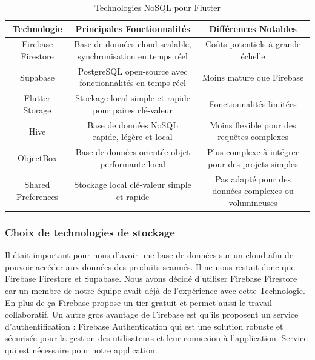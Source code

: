 \begin{table}[h!]
    \centering
    \begin{tabular}{|c|c|c|}
        \hline
        \textbf{Technologie} & \textbf{Principales Fonctionnalités}                          & \textbf{Différences Notables}                         \\
        \hline
        Firebase Firestore   & Base de données cloud scalable, synchronisation en temps réel & Coûts potentiels à grande échelle                     \\
        \hline
        Supabase             & PostgreSQL open-source avec fonctionnalités en temps réel     & Moins mature que Firebase                             \\
        \hline
        Flutter Storage      & Stockage local simple et rapide pour paires clé-valeur        & Fonctionnalités limitées                              \\
        \hline
        Hive                 & Base de données NoSQL rapide, légère et local                 & Moins flexible pour des requêtes complexes            \\
        \hline
        ObjectBox            & Base de données orientée objet performante local              & Plus complexe à intégrer pour des projets simples     \\
        \hline
        Shared Preferences   & Stockage local clé-valeur simple et rapide                    & Pas adapté pour des données complexes ou volumineuses \\
        \hline
    \end{tabular}
    \caption{Technologies NoSQL pour Flutter}
\end{table}

\subsubsection{Choix de technologies de stockage}

Il était important pour nous d'avoir une base de données sur un cloud afin de pouvoir accéder aux données des produits scannés. Il ne nous restait donc que Firebase Firestore et Supabase. Nous avons décidé d'utiliser Firebase Firestore car un membre de notre équipe avait déjà de l'expérience avec cette Technologie. En plus de ça Firebase propose un tier gratuit et permet aussi le travail collaboratif. Un autre gros avantage de Firebase est qu'ils proposent un service d'authentification : Firebase Authentication qui est une solution robuste et sécurisée pour la gestion des utilisateurs et leur connexion à l'application. Service qui est nécessaire pour notre application.



